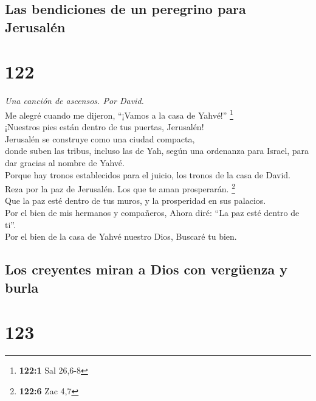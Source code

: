 \hypertarget{las-bendiciones-de-un-peregrino-para-jerusaluxe9n}{%
\subsection{Las bendiciones de un peregrino para
Jerusalén}\label{las-bendiciones-de-un-peregrino-para-jerusaluxe9n}}

\hypertarget{section-119}{%
\section{122}\label{section-119}}

\emph{Una canción de ascensos. Por David.}\\
 Me alegré cuando me dijeron, ``¡Vamos a la casa de
Yahvé!'' \footnote{\textbf{122:1} Sal 26,6-8}\\
 ¡Nuestros pies están dentro de tus puertas, Jerusalén!\\
 Jerusalén se construye como una ciudad compacta,\\
 donde suben las tribus, incluso las de Yah, según una
ordenanza para Israel, para dar gracias al nombre de Yahvé.\\
 Porque hay tronos establecidos para el juicio, los tronos
de la casa de David.\\
 Reza por la paz de Jerusalén. Los que te aman
prosperarán. \footnote{\textbf{122:6} Zac 4,7}\\
 Que la paz esté dentro de tus muros, y la prosperidad en
sus palacios.\\
 Por el bien de mis hermanos y compañeros, Ahora diré:
``La paz esté dentro de ti''.\\
 Por el bien de la casa de Yahvé nuestro Dios, Buscaré tu
bien.

\hypertarget{los-creyentes-miran-a-dios-con-verguxfcenza-y-burla}{%
\subsection{Los creyentes miran a Dios con vergüenza y
burla}\label{los-creyentes-miran-a-dios-con-verguxfcenza-y-burla}}

\hypertarget{section-120}{%
\section{123}\label{section-120}}

